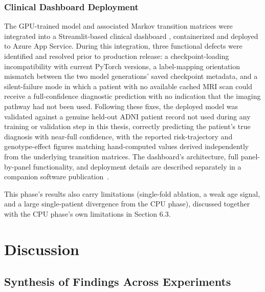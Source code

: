 \documentclass[pdflatex,sn-mathphys-num]{sn-jnl}%
\theoremstyle{thmstyleone}%
\theoremstyle{thmstyletwo}%
\theoremstyle{thmstylethree}%
\begin{document}
\subsubsection{Clinical Dashboard Deployment}\label{sec5_2_13}

The GPU-trained model and associated Markov transition matrices were integrated into a Streamlit-based clinical dashboard \cite{bib32}, containerized and deployed to Azure App Service. During this integration, three functional defects were identified and resolved prior to production release: a checkpoint-loading incompatibility with current PyTorch versions, a label-mapping orientation mismatch between the two model generations' saved checkpoint metadata, and a silent-failure mode in which a patient with no available cached MRI scan could receive a full-confidence diagnostic prediction with no indication that the imaging pathway had not been used. Following these fixes, the deployed model was validated against a genuine held-out ADNI patient record not used during any training or validation step in this thesis, correctly predicting the patient's true diagnosis with near-full confidence, with the reported risk-trajectory and genotype-effect figures matching hand-computed values derived independently from the underlying transition matrices. The dashboard's architecture, full panel-by-panel functionality, and deployment details are described separately in a companion software publication~\cite{bib30}.

This phase's results also carry limitations (single-fold ablation, a weak age signal, and a large single-patient divergence from the CPU phase), discussed together with the CPU phase's own limitations in Section 6.3.


\FloatBarrier
\section{Discussion}\label{sec6}

\subsection{Synthesis of Findings Across Experiments}\label{sec6_1}
\end{document}
